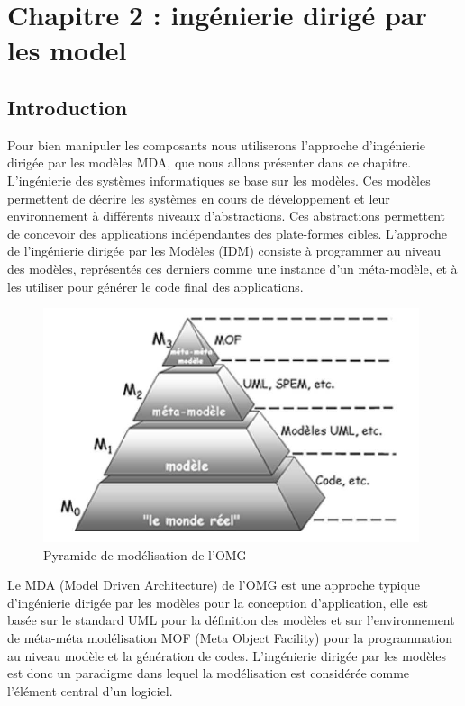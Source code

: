 \documentclass[
10pt, %
a4paper, %
oneside, %
headinclude,footinclude, %
BCOR5mm, %
]{report}
\begin{document}
	\newpage 
	\chapter{Chapitre 2 : ingénierie dirigé par les model}
	\minitoc  
	\section{Introduction}
    Pour  bien manipuler les composants nous utiliserons l’approche d'ingénierie dirigée par les modèles MDA, que nous allons présenter dans ce chapitre.
    L’ingénierie  des systèmes informatiques se base sur les modèles. Ces modèles permettent de décrire les systèmes en cours de développement et leur environnement à différents niveaux d’abstractions. Ces abstractions permettent de concevoir des applications indépendantes des plate-formes cibles. 
    L’approche de l’ingénierie dirigée par les Modèles (IDM) consiste à programmer au niveau des modèles, représentés ces derniers comme une instance d’un méta-modèle, et à les utiliser pour générer le code final des applications.\\[1.5cm]
    
    \begin{figure}[H] 
    \centering     
		\includegraphics[scale=0.8]{Figures/Pyramide_de_modelisation.png}
		\caption{Pyramide de modélisation de l'OMG \citep{PyramideMDA}}
		\end{figure}  
    
    Le MDA (Model Driven Architecture) de l’OMG est une approche typique d’ingénierie dirigée par les modèles pour la conception d’application, elle est basée sur le standard UML pour la définition des modèles et sur l’environnement de méta-méta modélisation MOF (Meta Object Facility) pour la programmation au niveau modèle et la génération de codes.
		L'ingénierie dirigée par les modèles est donc un paradigme dans lequel la modélisation est considérée comme l'élément central d'un logiciel.   
					
\end{document}
